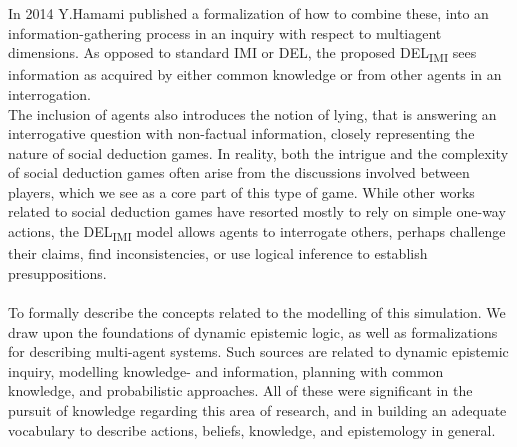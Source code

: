 In 2014 Y.Hamami\cite{delimi} published a formalization of how to combine
these, into an information-gathering process in an inquiry with respect to
multiagent dimensions. As opposed to standard IMI or DEL, the proposed
DEL\textsubscript{IMI} sees information as acquired by either common knowledge
or from other agents in an interrogation. \\ The inclusion of agents also
introduces the notion of lying, that is answering an interrogative question
with non-factual information, closely representing the nature of social
deduction games. In reality, both the intrigue and the complexity of social
deduction games often arise from the discussions involved between players,
which we see as a core part of this type of game. While other works related to
social deduction games have resorted mostly to rely on simple one-way actions,
the DEL\textsubscript{IMI} model allows agents to interrogate others, perhaps
challenge their claims, find inconsistencies, or use logical inference to
establish presuppositions.\\ \\ To formally describe the concepts related to
the modelling of this simulation. We draw upon the foundations of dynamic
epistemic logic, as well as formalizations for describing multi-agent systems.
Such sources are related to dynamic epistemic inquiry\cite{delimi}, modelling
knowledge- and information\cite{modelling_multi_agent_epistemic_systems},
planning with common
knowledge\cite{multi_agent_epistemic_planner_common_knowledge}, and
probabilistic approaches\cite{probibalistic_multiagent_systems}. All of these
were significant in the pursuit of knowledge regarding this area of research,
and in building an adequate vocabulary to describe actions, beliefs, knowledge,
and epistemology in general.